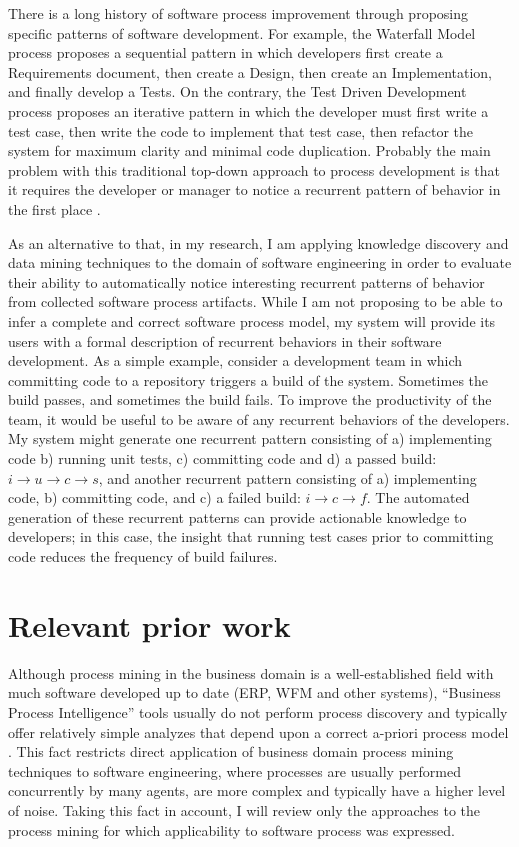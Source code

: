\documentclass{sig-alternate}
\begin{document}
There is a long history of software process improvement through proposing specific patterns of software development. For example, the Waterfall Model process proposes a sequential pattern in which developers first create a Requirements document, then create a Design, then create an Implementation, and finally develop a Tests. On the contrary, the Test Driven Development process proposes an iterative pattern in which the developer must first write a test case, then write the code to implement that test case, then refactor the system for maximum clarity and minimal code duplication. Probably the main problem with this traditional top-down approach to process development is that it requires the developer or manager to notice a recurrent pattern of behavior in the first place \cite{citeulike:5043104}. 

As an alternative to that, in my research, I am applying knowledge discovery and data mining techniques to the domain of software engineering in order to evaluate their ability to automatically notice interesting recurrent patterns of behavior from collected software process artifacts. While I am not proposing to be able to infer a complete and correct software process model, my system will provide its users with a formal description of recurrent behaviors in their software development. As a simple example, consider a development team in which committing code to a repository triggers a build of the system. Sometimes the build passes, and sometimes the build fails. To improve the productivity of the team, it would be useful to be aware of any recurrent behaviors of the developers. My system might generate one recurrent pattern consisting of a) implementing code b) running unit tests, c) committing code and d) a passed build: $i \rightarrow u \rightarrow c \rightarrow s $, and another recurrent pattern consisting of a) implementing code, b) committing code, and c) a failed build: $i \rightarrow c \rightarrow f $. The automated generation of these recurrent patterns can provide actionable knowledge to developers; in this case, the insight that running test cases prior to committing code reduces the frequency of build failures.

\section{Relevant prior work}
Although process mining in the business domain is a well-established field with much software developed up to date (ERP, WFM and other systems), ``Business Process Intelligence'' tools usually do not perform process discovery and typically offer relatively simple analyzes that depend upon a correct a-priori process model \cite{citeulike:3718014} \cite{citeulike:5044991} \cite{citeulike:2678511}. This fact restricts direct application of business domain process mining techniques to software engineering, where processes are usually performed concurrently by many agents, are more complex and typically have a higher level of noise. Taking this fact in account, I will review only the approaches to the process mining for which applicability to software process was expressed. 
\end{document}
